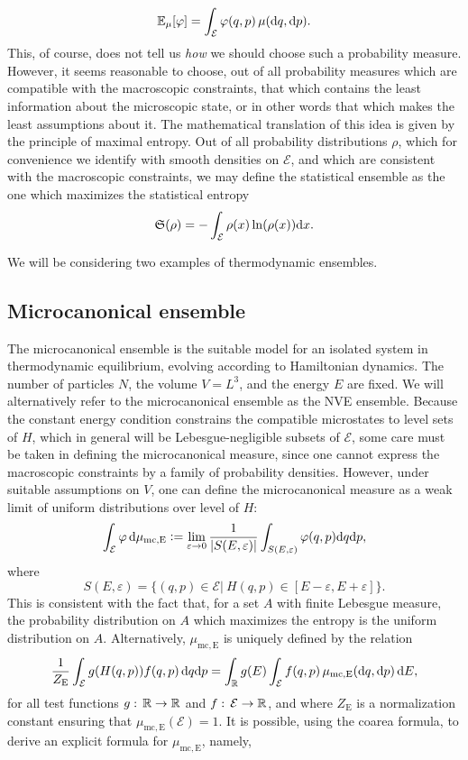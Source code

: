 \begin{equation}
    \label{eq:ensemble_average}
    \mathbb{E}_\mu[\varphi]=\int_{\mathcal E} \varphi(q,p)\,\mu(\mathrm{d} q,\mathrm{d} p).
\end{equation}
This, of course, does not tell us \textit{how} we should choose such a probability measure.
However, it seems reasonable to choose, out of all probability measures which are compatible with the macroscopic constraints,
 that which contains the least information about the microscopic state, or in other words that which makes the least assumptions about it.
The mathematical translation of this idea is given by the principle of maximal entropy. Out of all probability distributions $\rho$, which for convenience we identify with smooth densities on $\mathcal E$, and which are consistent with the macroscopic constraints,
we may define the statistical ensemble as the one which maximizes the statistical entropy
\begin{equation}
    \label{eq:entropy}
    \mathfrak S(\rho)=-\int_{\mathcal E} \rho(x)\ln(\rho(x))\mathrm{d}x.
\end{equation}

We will be considering two examples of thermodynamic ensembles.
\subsection{Microcanonical ensemble}
    The microcanonical ensemble is the suitable model for an isolated system in thermodynamic equilibrium, evolving according to Hamiltonian dynamics. The number of particles $N$, the volume $V=L^3$, and the energy $E$ are fixed. We will alternatively refer to the microcanonical ensemble as the NVE ensemble.
     Because the constant energy condition constrains the compatible microstates to level sets of $H$, which in general will be Lebesgue-negligible subsets of $\mathcal E$, some care must be taken in defining the microcanonical measure, since one cannot express the macroscopic constraints by a family of probability densities.
      However, under suitable assumptions on $V$, one can define the microcanonical measure as a weak limit of uniform distributions over level  of $H$:
    $$\int_\mathcal{E} \varphi\, \mathrm{d}\mu_{\mathrm{mc,E}} \mathrel{\mathop:}= \underset{\varepsilon \to 0}{\mathrm{lim}}\, \frac{1}{|S(E,\varepsilon)|}\int_{S(E,\varepsilon)} \varphi(q,p) \mathrm{d} q \mathrm{d} p,$$
    where 
    $$S(E,\varepsilon) = \{ (q,p) \in \mathcal E |\ H(q,p) \in [E-\varepsilon,E+\varepsilon]\}.$$
    This is consistent with the fact that, for a set $A$ with finite Lebesgue measure, the probability distribution on $A$ which maximizes the entropy is the uniform distribution on $A$. 
    Alternatively, $\mu_{\mathrm{mc,E}}$ is uniquely defined by the relation
    \[\frac{1}{Z_\mathrm{E}}\int_{\mathcal E}g(H(q,p))f(q,p)\,\mathrm{d}q\mathrm{d}p=\int_{\mathbb{R}}g(E)\int_{\mathcal E} f(q,p)\,\mu_{\mathrm{mc,E}}(\mathrm{d} q,\mathrm{d}p)\,\mathrm{d} E,\]
    for all test functions $g:\,\mathbb{R}\to \mathbb{R}$ and $f:\,\mathcal E\to \mathbb{R}$, and where $Z_{\mathrm{E}}$ is a normalization constant ensuring that $\mu_{\mathrm{mc,E}}(\mathcal E)=1$.
    It is possible, using the coarea formula, to derive an explicit formula for $\mu_{\mathrm{mc,E}}$, namely,

